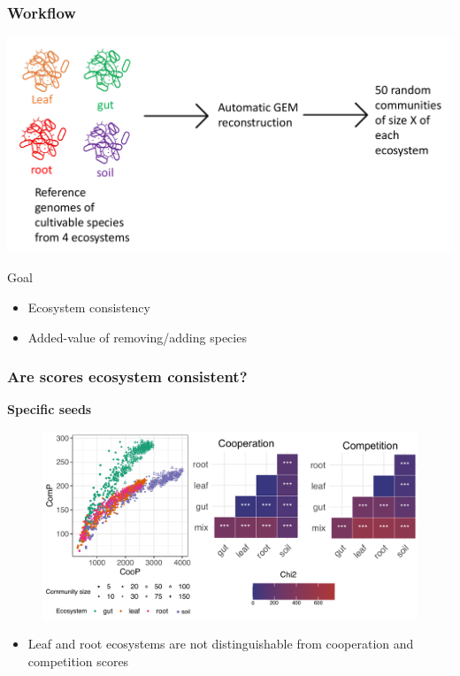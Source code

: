 \documentclass[8pt,usenames,dvipsnames]{beamer}
\begin{document}
\begin{frame}
\frametitle{Workflow}

\includegraphics[width=\textwidth]{figures/workflow-ccmc.pdf}

\begin{block}{Goal}
\begin{itemize}
\item Ecosystem consistency
\item Added-value of removing/adding species
\end{itemize}
\end{block}

\end{frame}


\begin{frame}
\frametitle{Are scores ecosystem consistent?}
\textbf{Specific seeds}
\begin{figure}
\includegraphics[width=\textwidth]{figures/coop-comp-ecosys-specific.pdf}
\end{figure}
\begin{alertblock}{}
\begin{itemize}
\item Leaf and root ecosystems are not distinguishable from cooperation and competition scores
\end{itemize}
\end{alertblock}
\end{frame}
\end{document}
